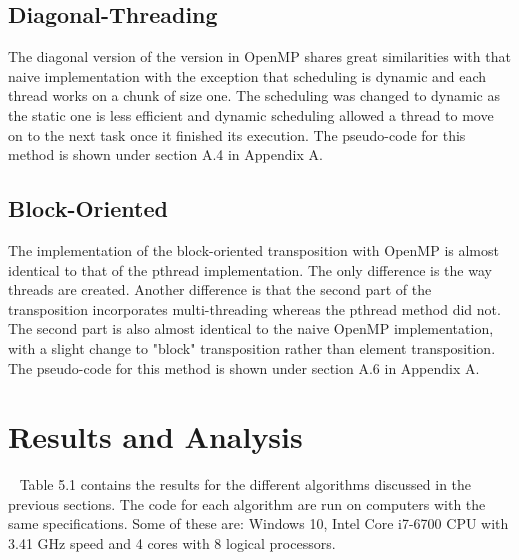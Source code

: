 \documentclass[10pt,journal]{article}
\begin{document}
\subsection{Diagonal-Threading}
The diagonal version of the version in OpenMP shares great similarities with that naive implementation with the exception that scheduling is dynamic and each thread works on a chunk of size one. The scheduling was changed to dynamic as the static one is less efficient and dynamic scheduling allowed a thread to move on to the next task once it finished its execution. The pseudo-code for this method is shown under section A.4 in Appendix A. 

\subsection{Block-Oriented}
The implementation of the block-oriented transposition with OpenMP is almost identical to that of the pthread implementation. The only difference is the way threads are created. Another difference is that the second part of the transposition incorporates multi-threading whereas the pthread method did not. The second part is also almost identical to the naive OpenMP implementation, with a slight change to "block" transposition rather than element transposition. The pseudo-code for this method is shown under section A.6 in Appendix A. 

\section{Results and Analysis}\
Table 5.1 contains the results for the different algorithms discussed in the previous sections. The code for each algorithm are run on computers with the same specifications. Some of these are: Windows 10, Intel Core i7-6700 CPU with 3.41 GHz speed and 4 cores with 8 logical processors.
\end{document}
